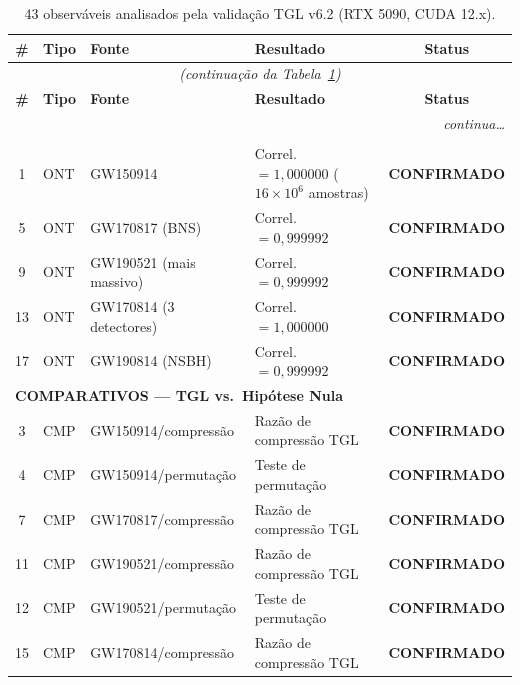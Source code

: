 \documentclass[12pt,a4paper,twoside]{article}
\newcommand{\confirmed}{\textcolor{tglgreen}{\textbf{CONFIRMADO}}}
\begin{document}
\begin{small}
\begin{longtable}{clp{3.5cm}p{4.5cm}c}
\caption{43 observ\'aveis analisados pela valida\c{c}\~ao TGL v6.2 (RTX 5090, CUDA 12.x).}
\label{tab:43obs}\\
\toprule
\textbf{\#} & \textbf{Tipo} & \textbf{Fonte} & \textbf{Resultado} & \textbf{Status} \\
\midrule
\endfirsthead
\multicolumn{5}{c}{\textit{(continua\c{c}\~ao da Tabela~\ref{tab:43obs})}} \\
\toprule
\textbf{\#} & \textbf{Tipo} & \textbf{Fonte} & \textbf{Resultado} & \textbf{Status} \\
\midrule
\endhead
\midrule
\multicolumn{5}{r}{\textit{continua\ldots}} \\
\endfoot
\bottomrule
\endlastfoot
%
\multicolumn{5}{l}{\textbf{ONTOL\'OGICOS --- Transforma\c{c}\~ao $g = \sqrt{|L|}$}} \\
\midrule
1  & ONT & GW150914             & Correl. $= 1{,}000000$ ($16\times10^6$ amostras) & \confirmed \\
5  & ONT & GW170817 (BNS)       & Correl. $= 0{,}999992$                           & \confirmed \\
9  & ONT & GW190521 (mais massivo) & Correl. $= 0{,}999992$                        & \confirmed \\
13 & ONT & GW170814 (3 detectores)& Correl. $= 1{,}000000$                         & \confirmed \\
17 & ONT & GW190814 (NSBH)      & Correl. $= 0{,}999992$                           & \confirmed \\
%
\midrule
\multicolumn{5}{l}{\textbf{COMPARATIVOS --- TGL vs.\ Hip\'otese Nula}} \\
\midrule
3  & CMP & GW150914/compress\~ao  & Raz\~ao de compress\~ao TGL                      & \confirmed \\
4  & CMP & GW150914/permuta\c{c}\~ao & Teste de permuta\c{c}\~ao                     & \confirmed \\
7  & CMP & GW170817/compress\~ao  & Raz\~ao de compress\~ao TGL                      & \confirmed \\
11 & CMP & GW190521/compress\~ao  & Raz\~ao de compress\~ao TGL                      & \confirmed \\
12 & CMP & GW190521/permuta\c{c}\~ao & Teste de permuta\c{c}\~ao                     & \confirmed \\
15 & CMP & GW170814/compress\~ao  & Raz\~ao de compress\~ao TGL                      & \confirmed \\

\end{longtable}
\end{small}
\end{document}
